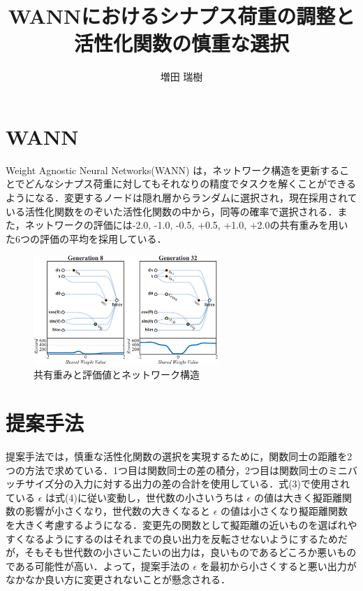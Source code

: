 \documentclass[dvipdfmx]{jarticle}
\title{WANNにおけるシナプス荷重の調整と活性化関数の慎重な選択}
\author{増田 瑞樹}
\begin{document}
\maketitle

\section{WANN}
Weight Agnostic Neural Networks(WANN) は，ネットワーク構造を更新することでどんなシナプス荷重に対してもそれなりの精度でタスクを解くことができるようになる．変更するノードは隠れ層からランダムに選択され，現在採用されている活性化関数をのぞいた活性化関数の中から，同等の確率で選択される．また，ネットワークの評価には-2.0, -1.0, -0.5, +0.5, +1.0, +2.0の共有重みを用いた6つの評価の平均を採用している．

\begin{figure}[h]
    \centering
    \includegraphics[width=70mm]{img/img01.png}
    \caption{共有重みと評価値とネットワーク構造}
\end{figure}

\section{提案手法}
提案手法では，慎重な活性化関数の選択を実現するために，関数同士の距離を2つの方法で求めている．1つ目は関数同士の差の積分，2つ目は関数同士のミニバッチサイズ分の入力に対する出力の差の合計を使用している．式(3)で使用されている $\epsilon$ は式(4)に従い変動し，世代数の小さいうちは $\epsilon$ の値は大きく擬距離関数の影響が小さくなり，世代数の大きくなると $\epsilon$ の値は小さくなり擬距離関数を大きく考慮するようになる．変更先の関数として擬距離の近いものを選ばれやすくなるようにするのはそれまでの良い出力を反転させないようにするためだが，そもそも世代数の小さいこたいの出力は，良いものであるどころか悪いものである可能性が高い．よって，提案手法の $\epsilon$ を最初から小さくすると悪い出力がなかなか良い方に変更されないことが懸念される．
\end{document}
